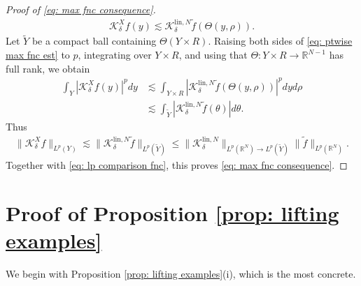 \documentclass[reqno,11pt]{amsart}
\numberwithin{equation}{section}
\numberwithin{figure}{section}
\def\R{\mathbb{R}}
\renewcommand\leq{\leqslant}
\theoremstyle{plain}
\theoremstyle{definition}
\newcommand{\lin}{\mathrm{lin}}
\begin{document}
\begin{proof}[Proof of \eqref{eq: max fnc consequence}]
\begin{align}
        \mathcal K_\delta^X f(y) \lesssim \mathcal K_{\delta}^{\lin, N} \tilde f(\Theta(y,\rho)).
    \end{align}
    Let $\widetilde Y$ be a compact ball containing $\Theta(Y \times R)$.
    Raising both sides of \eqref{eq: ptwise max fnc est} to $p$, integrating over $Y \times R$, and using that $\Theta : Y \times R \to \R^{N-1}$ has full rank, we obtain 
    \begin{align}
        \int_Y |\mathcal K_\delta^X f(y)|^p dy &\lesssim \int_{Y \times R} |\mathcal K_\delta^{\lin, N} \tilde f(\Theta(y,\rho))|^p dy d\rho  \\
        &\lesssim \int_{\widetilde Y} |\mathcal K_{\delta}^{\lin, N} \tilde f(\theta)| d\theta.
    \end{align}
    Thus
    \begin{align}
        \| \mathcal K_\delta^{X} f\|_{L^p(Y)} \lesssim \|\mathcal K_{\delta}^{\lin, N} \tilde f \|_{L^p(\widetilde Y)} \leq \|\mathcal K_\delta^{\lin,N}\|_{L^p(\R^N)\to L^p(\widetilde Y)} \| \tilde f\|_{L^p(\R^N)}.
    \end{align}
    Together with \eqref{eq: lp comparison fnc}, this proves \eqref{eq: max fnc consequence}. 
    \end{proof}


    \section{Proof of Proposition \ref{prop: lifting examples}}\label{sec: prop: lifting examples}

    We begin with Proposition \ref{prop: lifting examples}(i), which is the most concrete. 
    
\end{document}
